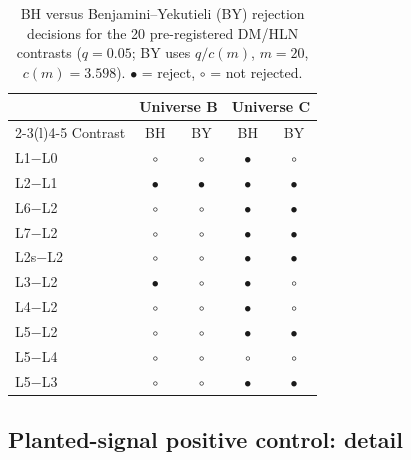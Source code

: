 \documentclass{article}
\begin{document}
\begin{table}[h]
  \centering
  \caption{BH versus Benjamini--Yekutieli (BY) rejection decisions for the 20
  pre-registered DM/HLN contrasts ($q=0.05$; BY uses $q/c(m)$, $m=20$,
  $c(m)=3.598$). $\bullet$ = reject, $\circ$ = not rejected.}
  \label{app:robust:tab-fdr}
  {\small
  \setlength{\tabcolsep}{4pt}
  \begin{tabular}{@{}lcccc@{}}
    \toprule
    & \multicolumn{2}{c}{Universe B} & \multicolumn{2}{c}{Universe C} \\
    \cmidrule(lr){2-3}\cmidrule(l){4-5}
    Contrast & BH & BY & BH & BY \\
    \midrule
    L1$-$L0  & $\circ$   & $\circ$ & $\bullet$ & $\circ$   \\
    L2$-$L1  & $\bullet$ & $\bullet$ & $\bullet$ & $\bullet$ \\
    L6$-$L2  & $\circ$   & $\circ$ & $\bullet$ & $\bullet$ \\
    L7$-$L2  & $\circ$   & $\circ$ & $\bullet$ & $\bullet$ \\
    L2s$-$L2 & $\circ$   & $\circ$ & $\bullet$ & $\bullet$ \\
    L3$-$L2  & $\bullet$ & $\circ$ & $\bullet$ & $\circ$   \\
    L4$-$L2  & $\circ$   & $\circ$ & $\bullet$ & $\circ$   \\
    L5$-$L2  & $\circ$   & $\circ$ & $\bullet$ & $\bullet$ \\
    L5$-$L4  & $\circ$   & $\circ$ & $\circ$   & $\circ$   \\
    L5$-$L3  & $\circ$   & $\circ$ & $\bullet$ & $\bullet$ \\
    \bottomrule
  \end{tabular}}
\end{table}

\subsection{Planted-signal positive control: detail}\label{app:robust:planted}

\end{document}
